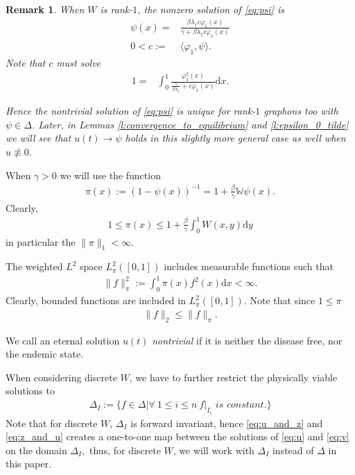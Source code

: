 \documentclass{article}
\renewcommand{\d}{\mathrm{d}}
\newcommand{\W}{\mathbb{W}}
\newcommand{\1}[1]{{\mathds{1}}_{\left\{#1\right\}}}
\newtheorem{remark}{Remark}
\newcommand{\rem}[1]{{#1}}
\begin{document}
\begin{remark}
When $W$ is rank-$1$, the nonzero solution of \eqref{eq:psi} is
\begin{align*}
\psi(x)=&\frac{\beta \lambda_1 c \varphi_1(x)}{\gamma+ \beta \lambda_1 c \varphi_1(x)}\\
0<c:=&\langle  \varphi_1, \psi \rangle.
\end{align*}
Note that $c$ must solve
\begin{align*}
	1=& \int_{0}^{1} \frac{\varphi_1^2(x)}{\frac{\gamma}{\beta \lambda_1 }+c\varphi_1(x)} \d x.
\end{align*}


Hence the nontrivial solution of \eqref{eq:psi} is unique for rank-$1$ graphons too with $\psi \in \Delta$. Later, in Lemmas \ref{l:convergence_to_equilibrium} and \ref{l:epsilon_0_tilde} we will see that $u(t) \to \psi$ holds in this slightly more general case as well when $u \not \equiv 0.$ 
\end{remark}

When $\gamma>0$ we will use the function
\begin{align}
	\label{eq:pi}
	\pi(x):= \left( 1-\psi(x)\right)^{-1}=1+\frac{\beta}{\gamma} \W \psi(x).
\end{align}
Clearly,
\begin{align*}
	1 \leq \pi(x) \leq 1+\frac{\beta}{\gamma} \int_{0}^{1} W(x,y) \d y
\end{align*}
in particular the $\|\pi \|_1 < \infty$.

The weighted $L^2$ space $L^2_{\pi}([0,1])$ includes measurable functions such that
\begin{align}
\label{eq:pi_norm}
\|f \|_{\pi}^2:= \int_{0}^{1} \pi(x) f^2(x) \d x<\infty. 
\end{align} 
Clearly, bounded functions are included in $L^2_{\pi}([0,1])$. Note that since $1 \leq \pi$
\begin{align*}
 \| f\|_2 \leq \|f \|_{\pi}.
\end{align*}

We call an eternal solution $u(t)$ \emph{nontrivial} if it is neither the disease free, nor the endemic state.

When considering discrete $W$, we have to further restrict the physically viable solutions to
\begin{align}
	\label{eq:Delta_I}
	\Delta_I:=\{ \left. f \in \Delta \right| \forall \ 1 \leq i \leq n \ f|_{I_i} \textit{ is constant.} \}
\end{align}
Note that for discrete $W$, $\Delta_I$ is forward invariant, hence \eqref{eq:u_and_z} \rem{and \eqref{eq:z_and_u}} creates a one-to-one map between the solutions of \eqref{eq:u} and \eqref{eq:v} on the domain $\Delta_{I},$ thus, for discrete $W$, we will work with $\Delta_I$ instead of $\Delta$ in this paper.
 
\end{document}

